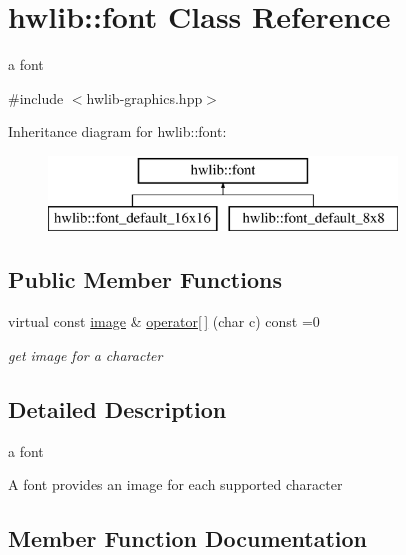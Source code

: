 \hypertarget{classhwlib_1_1font}{}\section{hwlib\+:\+:font Class Reference}
\label{classhwlib_1_1font}


a font  




{\ttfamily \#include $<$hwlib-\/graphics.\+hpp$>$}

Inheritance diagram for hwlib\+:\+:font\+:\begin{figure}[H]
\begin{center}
\leavevmode
\includegraphics[height=2.000000cm]{classhwlib_1_1font}
\end{center}
\end{figure}
\subsection*{Public Member Functions}
\begin{DoxyCompactItemize}
\item 
virtual const \hyperlink{classhwlib_1_1image}{image} \& \hyperlink{classhwlib_1_1font_ab292f5c14db5727c2ef67cfa8df4e88d}{operator\mbox{[}$\,$\mbox{]}} (char c) const  =0
\begin{DoxyCompactList}\small\item\em get image for a character \end{DoxyCompactList}\end{DoxyCompactItemize}


\subsection{Detailed Description}
a font 

A font provides an image for each supported character 

\subsection{Member Function Documentation}
